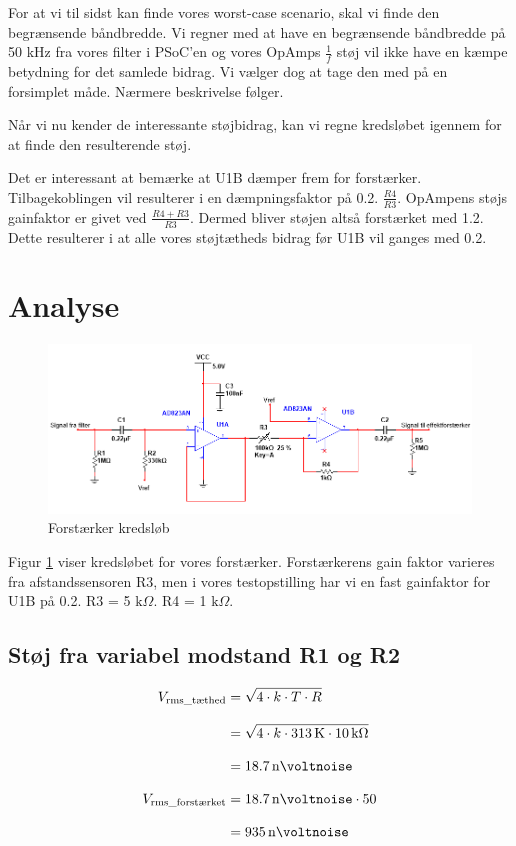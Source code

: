 \documentclass[a4paper, 11pt, article,oneside,openany]{memoir} %
\newcommand{\tsub}[1]{_{\textup{#1}}}
\begin{document}
For at vi til sidst kan finde vores worst-case scenario, skal vi finde den begrænsende båndbredde. Vi regner med at have en begrænsende båndbredde på 50 kHz fra vores filter i PSoC'en og vores OpAmps $\frac{1}{f}$ støj vil ikke have en kæmpe betydning for det samlede bidrag. Vi vælger dog at tage den med på en forsimplet måde. Nærmere beskrivelse følger.

Når vi nu kender de interessante støjbidrag, kan vi regne kredsløbet igennem for at finde den resulterende støj.

Det er interessant at bemærke at U1B dæmper frem for forstærker. Tilbagekoblingen vil resulterer i en dæmpningsfaktor på 0.2. $\frac{R4}{R3}$.
OpAmpens støjs gainfaktor er givet ved $\frac{R4+R3}{R3}$. Dermed bliver støjen altså forstærket med 1.2.
Dette resulterer i at alle vores støjtætheds bidrag før U1B vil ganges med 0.2.

\section{Analyse}

\begin{figure}[ht] %
	\centering
	\includegraphics[width=\textwidth]{figure/kreds1}
	\caption{Forstærker kredsløb}
	\label{fig:kreds1}
\end{figure}
Figur \ref{fig:kreds1} viser kredsløbet for vores forstærker. Forstærkerens gain faktor varieres fra afstandssensoren R3, men i vores testopstilling har vi en fast gainfaktor for U1B på 0.2. R3 = 5 $\si{\kilo\Omega}$. R4 = 1 $\si{\kilo\Omega}$.



\subsection{Støj fra variabel modstand R1 og R2}



\begin{align*}
V\tsub{rms\_tæthed} &= \sqrt{4 \cdot k \cdot T \cdot R}
\\[2.0ex]
&= \sqrt{4 \cdot k\cdot \SI{313}{\kelvin} \cdot \SI{10}{\kilo\ohm}}
\\[2.0ex]
&= \SI{18.7}{\nano\voltnoise}
\\[2.0ex]
V\tsub{rms\_forstærket} &= \SI{18.7}{\nano\voltnoise} \cdot 50
\\[2.0ex]
&= \SI{935}{\nano\voltnoise}
\end{align*}
\end{document}
